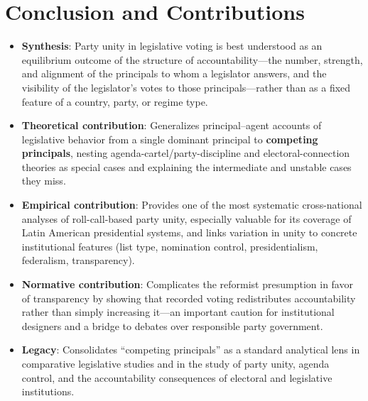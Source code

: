 \documentclass[12pt]{article}
\begin{document}
\section{Conclusion and Contributions}

\begin{itemize}[leftmargin=*, itemsep=4pt]
    \item \textbf{Synthesis}: Party unity in legislative voting is best understood as an equilibrium outcome of the structure of accountability---the number, strength, and alignment of the principals to whom a legislator answers, and the visibility of the legislator's votes to those principals---rather than as a fixed feature of a country, party, or regime type.
    \item \textbf{Theoretical contribution}: Generalizes principal--agent accounts of legislative behavior from a single dominant principal to \textbf{competing principals}, nesting agenda-cartel/party-discipline and electoral-connection theories as special cases and explaining the intermediate and unstable cases they miss.
    \item \textbf{Empirical contribution}: Provides one of the most systematic cross-national analyses of roll-call-based party unity, especially valuable for its coverage of Latin American presidential systems, and links variation in unity to concrete institutional features (list type, nomination control, presidentialism, federalism, transparency).
    \item \textbf{Normative contribution}: Complicates the reformist presumption in favor of transparency by showing that recorded voting redistributes accountability rather than simply increasing it---an important caution for institutional designers and a bridge to debates over responsible party government.
    \item \textbf{Legacy}: Consolidates ``competing principals'' as a standard analytical lens in comparative legislative studies and in the study of party unity, agenda control, and the accountability consequences of electoral and legislative institutions.
\end{itemize}
\end{document}
